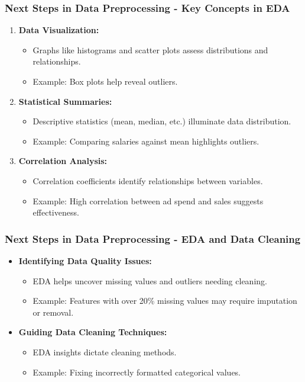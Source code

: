 \documentclass[aspectratio=169]{beamer}
\begin{document}
\begin{frame}[fragile]
    \frametitle{Next Steps in Data Preprocessing - Key Concepts in EDA}
    \begin{enumerate}
        \item \textbf{Data Visualization:}
            \begin{itemize}
                \item Graphs like histograms and scatter plots assess distributions and relationships.
                \item Example: Box plots help reveal outliers.
            \end{itemize}
        \item \textbf{Statistical Summaries:}
            \begin{itemize}
                \item Descriptive statistics (mean, median, etc.) illuminate data distribution.
                \item Example: Comparing salaries against mean highlights outliers.
            \end{itemize}
        \item \textbf{Correlation Analysis:}
            \begin{itemize}
                \item Correlation coefficients identify relationships between variables.
                \item Example: High correlation between ad spend and sales suggests effectiveness.
            \end{itemize}
    \end{enumerate}
\end{frame}

\begin{frame}[fragile]
    \frametitle{Next Steps in Data Preprocessing - EDA and Data Cleaning}
    \begin{itemize}
        \item \textbf{Identifying Data Quality Issues:}
            \begin{itemize}
                \item EDA helps uncover missing values and outliers needing cleaning.
                \item Example: Features with over 20\% missing values may require imputation or removal.
            \end{itemize}
        \item \textbf{Guiding Data Cleaning Techniques:}
            \begin{itemize}
                \item EDA insights dictate cleaning methods.
                \item Example: Fixing incorrectly formatted categorical values.
            \end{itemize}
    \end{itemize}
\end{frame}
\end{document}
